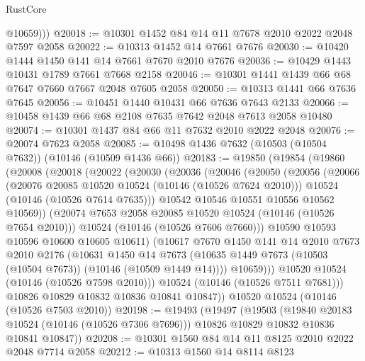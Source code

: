 \begin{lexlean}{RustCore}
\begin{coremodule}
          @10659)))
@20018 := @10301 @1452 @84 @14 @11 @7678 @2010 @2022 @2048 @7597 @2058
@20022 := @10313 @1452 @14 @7661 @7676
@20030 := @10420 @1444 @1450 @141 @14 @7661 @7670 @2010 @7676
@20036 := @10429 @1443 @10431 @1789 @7661 @7668 @2158
@20046 := @10301 @1441 @1439 @66 @68 @7647 @7660 @7667 @2048 @7605 @2058
@20050 := @10313 @1441 @66 @7636 @7645
@20056 := @10451 @1440 @10431 @66 @7636 @7643 @2133
@20066 := @10458 @1439 @66 @68 @2108 @7635 @7642 @2048 @7613 @2058 @10480
@20074 := @10301 @1437 @84 @66 @11 @7632 @2010 @2022 @2048
@20076 := @20074 @7623 @2058
@20085 := @10498 @1436 @7632 (@10503 (@10504 @7632)) (@10146 (@10509 @1436 @66))
@20183 := @19850
    (@19854
      (@19860
        (@20008
          (@20018
            (@20022
              (@20030
                (@20036
                  (@20046
                    (@20050
                      (@20056
                        (@20066
                          (@20076 @20085 @10520 @10524 (@10146 (@10526 @7624 @2010)))
                          @10524
                          (@10146 (@10526 @7614 @7635)))
                        @10542
                        @10546
                        @10551
                        @10556
                        @10562
                        @10569))
                    (@20074 @7653 @2058 @20085 @10520 @10524 (@10146 (@10526 @7654 @2010)))
                    @10524
                    (@10146 (@10526 @7606 @7660)))
                  @10590
                  @10593
                  @10596
                  @10600
                  @10605
                  @10611)
                (@10617
                  @7670
                  @1450
                  @141
                  @14
                  @2010
                  @7673
                  @2010
                  @2176
                  (@10631
                    @1450
                    @14
                    @7673
                    (@10635 @1449 @7673 (@10503 (@10504 @7673)) (@10146 (@10509 @1449 @14))))
                  @10659)))
            @10520
            @10524
            (@10146 (@10526 @7598 @2010)))
          @10524
          (@10146 (@10526 @7511 @7681)))
        @10826
        @10829
        @10832
        @10836
        @10841
        @10847))
    @10520
    @10524
    (@10146 (@10526 @7503 @2010))
@20198 := @19493
    (@19497
      (@19503
        (@19840 @20183 @10524 (@10146 (@10526 @7306 @7696)))
        @10826
        @10829
        @10832
        @10836
        @10841
        @10847))
@20208 := @10301 @1560 @84 @14 @11 @8125 @2010 @2022 @2048 @7714 @2058
@20212 := @10313 @1560 @14 @8114 @8123

\end{coremodule}
\end{lexlean}
